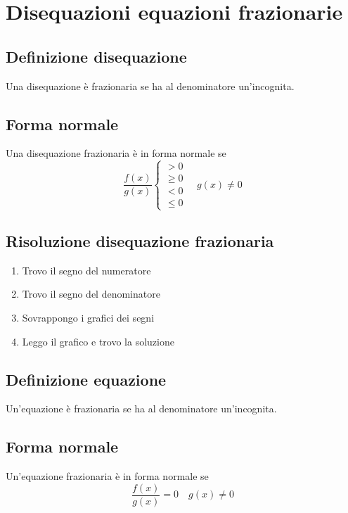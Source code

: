 \chapter{Disequazioni equazioni frazionarie}
\section{Definizione disequazione}
Una disequazione è frazionaria se ha al denominatore un'incognita.
\section{Forma normale}
Una disequazione frazionaria è in forma normale se
\begin{equation*}
\dfrac{f(x)}{g(x)}\begin{cases}
>0\\
\geq 0\\
<0\\
\leq 0
\end{cases}\quad g(x)\neq 0
\end{equation*}
\section{Risoluzione disequazione frazionaria}
\begin{enumerate}
	\item Trovo il segno del numeratore
	\item Trovo il segno del denominatore
	\item Sovrappongo i grafici dei segni
	\item Leggo il grafico e trovo la soluzione
\end{enumerate}
\section{Definizione equazione}
Un'equazione è frazionaria se ha al denominatore un'incognita.
\section{Forma normale}
Un'equazione frazionaria è in forma normale se
\begin{equation*}
\dfrac{f(x)}{g(x)}=0\quad g(x)\neq 0
\end{equation*}
